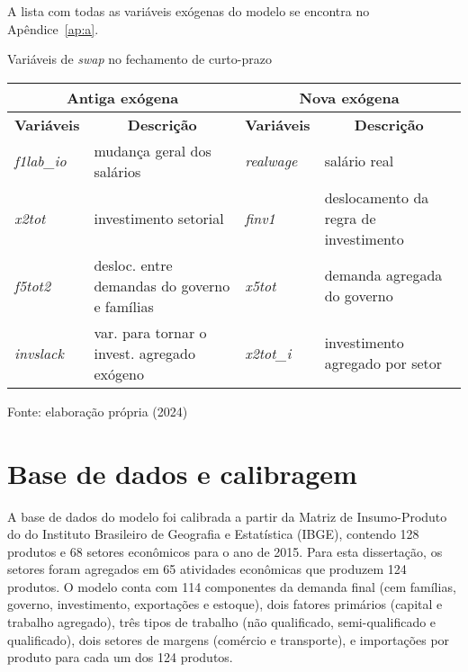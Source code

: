 A lista com todas as variáveis exógenas do modelo se encontra no Apêndice~\ref{ap:a}.


\begin{quadro}[h]
	\centering
	\begin{threeparttable}
		\caption{Variáveis de \textit{swap} no fechamento de curto-prazo} \label{quad:fechamento}
		\footnotesize
		\begin{tabular}{||l m{6.5cm} |l m{5.5cm} ||}
			\hline \hline
			\multicolumn{2}{||c|}{\textbf{Antiga exógena}}                     & \multicolumn{2}{c||}{\textbf{Nova exógena}} \\ \hline
			\textbf{Variáveis} & \multicolumn{1}{c|}{\textbf{Descrição}}      & \textbf{Variáveis} & \multicolumn{1}{c||}{\textbf{Descrição}} \\ \hline
			\textit{f1lab\_io}  & mudança geral dos salários                  & \textit{realwage}  & salário real \\
			\textit{x2tot}     & investimento setorial                        & \textit{finv1}     & deslocamento da regra de investimento \\
			\textit{f5tot2}    & desloc. entre demandas do governo e famílias & \textit{x5tot}     & demanda agregada do governo \\
			\textit{invslack}  & var. para tornar o invest. agregado exógeno  & \textit{x2tot\_i}  & investimento agregado por setor \\ \hline \hline
		\end{tabular}
		\begin{tablenotes}
			\scriptsize
			\item Fonte: elaboração própria (2024)
		\end{tablenotes}
	\end{threeparttable}
\end{quadro}


\section{Base de dados e calibragem} \label{sec:dados}

A base de dados do modelo foi calibrada a partir da Matriz de Insumo-Produto do  do Instituto Brasileiro de Geografia e Estatística (IBGE), contendo 128 produtos e 68 setores econômicos para o ano de 2015. Para esta dissertação, os setores foram agregados em 65 atividades econômicas que produzem 124 produtos. O modelo conta com 114 componentes da demanda final (cem famílias, governo, investimento, exportações e estoque), dois fatores primários (capital e trabalho agregado), três tipos de trabalho (não qualificado, semi-qualificado e qualificado), dois setores de margens (comércio e transporte), e importações por produto para cada um dos 124 produtos.


